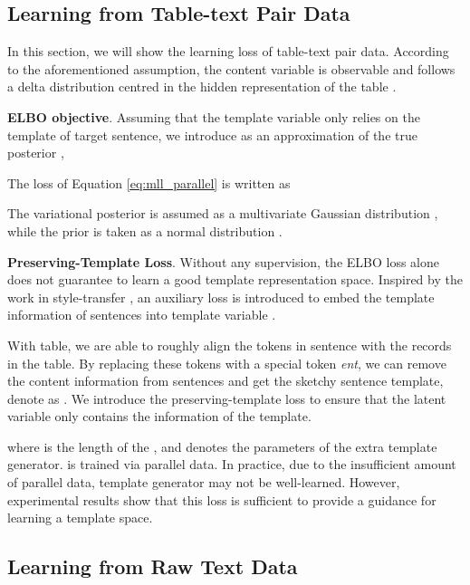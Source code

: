 \subsection{Learning from Table-text Pair Data}
\label{sec:object_parallel}
In this section, we will show the learning loss of table-text pair data. 
According to the aforementioned assumption, the content variable  is observable and follows a delta distribution centred in the hidden representation of the table . 




\noindent\textbf{ELBO objective}. \quad Assuming that the template variable  only relies on the template of target sentence, we introduce  as an approximation of the true posterior ,  


The  loss of Equation \ref{eq:mll_parallel} is written as  

The variational posterior  is assumed as a multivariate Gaussian distribution , while the prior  is taken as a normal distribution .

\noindent\textbf{Preserving-Template Loss}. \quad
Without any supervision, the ELBO loss alone does not guarantee to learn a good template representation space. Inspired by the work in style-transfer \citep{hzticml17_disent, disent_in_ST1, baoyu, disent_in_ST2_ACL19}, an auxiliary loss is introduced to embed the template information of sentences into template variable .

With table, we are able to roughly align the tokens in sentence with the records in the table. By replacing these tokens with a special token \textit{ent}, we can remove the content information from sentences and get the sketchy sentence template, denote as . We introduce the preserving-template loss  to ensure that the latent variable  only contains the information of the template.

where  is the length of the , and  denotes the parameters of the extra template generator. 
 is trained via parallel data. In practice, due to the insufficient amount of parallel data, template generator  may not be well-learned. However, experimental results show that this loss is sufficient to provide a guidance for learning a template space.












\subsection{Learning from Raw Text Data}
\label{sec:object_non-parallel}

